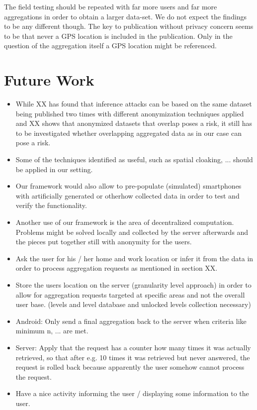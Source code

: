 The field testing should be repeated with far more users and far more aggregations in order to obtain a larger data-set. We do not expect the findings to be any different though. The key to publication without privacy concern seems to be that never a GPS location is included in the publication. Only in the question of the aggregation itself a GPS location might be referenced.

\section{Future Work}
\begin{itemize}
	\item While XX has found that inference attacks can be based on the same dataset being published two times with different anonymization techniques applied and XX shows that anonymized datasets that overlap poses a risk, it still has to be investigated whether overlapping aggregated data as in our case can pose a risk.
	\item Some of the techniques identified as useful, such as spatial cloaking, ... should be applied in our setting.
	\item Our framework would also allow to pre-populate (simulated) smartphones with artificially generated or otherhow collected data in order to test and verify the functionality.
	\item Another use of our framework is the area of decentralized computation. Problems might be solved locally and collected by the server afterwards and the pieces put together still with anonymity for the users.
	\item Ask the user for his / her home and work location or infer it from the data in order to process aggregation requests as mentioned in section XX.
	\item Store the users location on the server (granularity level approach) in order to allow for aggregation requests targeted at specific areas and not the overall user base. (levels and level database and unlocked levels collection necessary)
	\item Android: Only send a final aggregation back to the server when criteria like minimum n, ... are met.
	\item Server: Apply that the request has a counter how many times it was actually retrieved, so that after e.g. 10 times it was retrieved but never answered, the request is rolled back because apparently the user somehow cannot process the request.
	\item Have a nice activity informing the user / displaying some information to the user.

\end{itemize}
